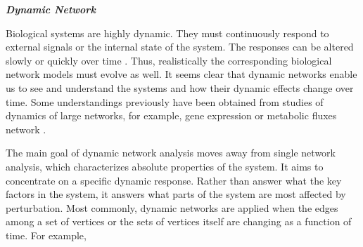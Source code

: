 \textbf{\textit{Dynamic Network}}

Biological systems are highly dynamic. They must continuously respond to external signals or the internal state of the system. The responses can be altered slowly or quickly over time \citep{Peer:2011jd}. Thus, realistically the corresponding biological network models must evolve as well. It seems clear that dynamic networks enable us to see and understand the systems and how their dynamic effects change over time. Some understandings previously have been obtained from studies of dynamics of large networks, for example, gene expression or metabolic fluxes network \citep{Idekerdiffnet}.

The main goal of dynamic network analysis moves away from single network analysis, which characterizes absolute properties of the system. It aims to concentrate on a specific dynamic response. Rather than answer what the key factors in the system, it answers what parts of the system are most affected by perturbation. Most commonly, dynamic networks are applied when the edges among a set of vertices or the sets of vertices itself are changing as a function of time. For example, 
